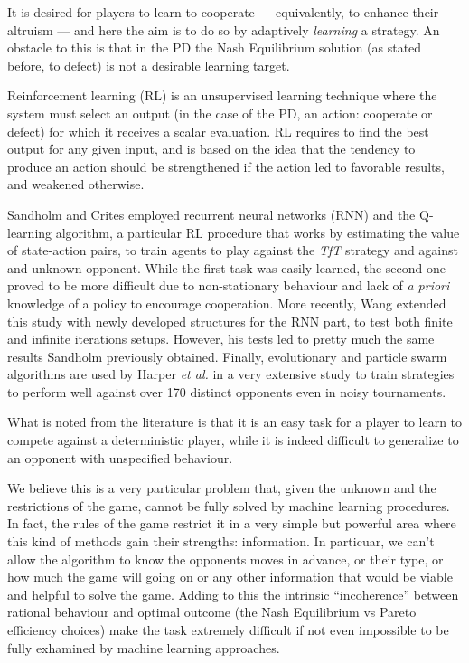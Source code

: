 \documentclass[journal,a4paper,10pt,twoside]{IEEEtran} %
\begin{document}
It is desired for players to learn to cooperate --- equivalently, to enhance their altruism --- and here the aim is to do so by adaptively \textit{learning} a strategy. An obstacle to this is that in the PD the Nash Equilibrium solution (as stated before, to defect) is not a desirable learning target. \cite{coopSeqRL}

Reinforcement learning (RL) is an unsupervised learning technique where the system must select an output (in the case of the PD, an action: cooperate or defect) for which it receives a scalar evaluation. RL requires to find the best output for any given input, and is based on the idea that the tendency to produce an action should be strengthened if the action led to favorable results, and weakened otherwise. \cite{sandholmRL}

Sandholm and Crites \cite{sandholmRL} employed recurrent neural networks (RNN) and the Q-learning algorithm, a particular RL procedure that works by estimating the value of state-action pairs, to train agents to play against the \textit{TfT} strategy and against and unknown opponent. While the first task was easily learned, the second one proved to be more difficult due to non-stationary behaviour and lack of \textit{a priori} knowledge of a policy to encourage cooperation.
More recently, Wang \cite{kedaoRL} extended this study with newly developed structures for the RNN part, to test both finite and infinite iterations setups. However, his tests led to pretty much the same results Sandholm previously obtained.
Finally, evolutionary and particle swarm algorithms are used by Harper \textit{et al.} in a very extensive study \cite{plosRLdominant} to train strategies to perform well against over 170 distinct opponents even in noisy tournaments.

What is noted from the literature is that it is an easy task for a player to learn to compete against a deterministic player, while it is indeed difficult to generalize to an opponent with unspecified behaviour.

We believe this is a very particular problem that, given the unknown and the restrictions of the game, cannot be fully solved by machine learning procedures. In fact, the rules of the game restrict it in a very simple but powerful area where this kind of methods gain their strengths: information. In particuar, we can't allow the algorithm to know the opponents moves in advance, or their type, or how much the game will going on or any other information that would be viable and helpful to solve the game. Adding to this the intrinsic ``incoherence'' between rational behaviour and optimal outcome (the Nash Equilibrium vs Pareto efficiency choices) make the task extremely difficult if not even impossible to be fully exhamined by machine learning approaches.
\end{document}
